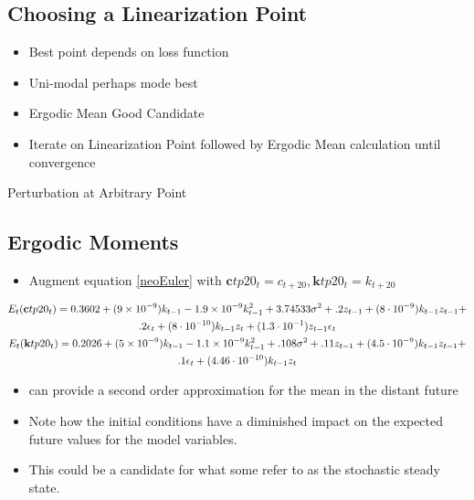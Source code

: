 \documentclass[12pt]{article}
\begin{document}
\subsection{Choosing a Linearization Point}
  \begin{itemize}
  \item Best point depends on loss function
  \item Uni-modal perhaps mode best
  \item Ergodic Mean Good Candidate
  \item Iterate on Linearization Point followed by Ergodic Mean calculation until convergence
  \end{itemize}

{Perturbation at Arbitrary Point}
{\small
{}
}



\subsection{Ergodic  Moments}
\label{sec:impulse-resp-funct}

  \begin{itemize}
   \item Augment equation \ref{neoEuler} with $\mathbf{c}tp20_t = c_{t+20}, \mathbf{k}tp20_t = k_{t+20}$
    \end{itemize}
{\tiny
 \begin{gather*} 
E_t(     \mathbf{c}tp20_t)= 0.3602 + (9 \times  10^{-9}) k_{t-1} -1.9 \times 10^{-9} k_{t-1}^2 + 3.74533 \sigma^2 + .2 z_{t-1} +(8 \cdot 10^{-9}) k_{t-1} z_{t-1} +\\
 .2 \epsilon_t  +(8 \cdot 10^{-10}) k_{t-1} z_t + (1.3 \cdot 10^{-1}) z_{t-1} \epsilon_t\\
E_t(       \mathbf{k}tp20_t) = 0.2026 + (5 \times  10^{-9}) k_{t-1} -1.1 \times 10^{-9} k_{t-1}^2 + .108 \sigma^2 + .11 z_{t-1} +(4.5 \cdot 10^{-9}) k_{t-1} z_{t-1} +\\
 .1 \epsilon_t  +(4.46 \cdot 10^{-10}) k_{t-1} z_t 
 \end{gather*}
}
    \begin{itemize}
  \item can provide a second order approximation for the
mean in the distant future
 \item Note how the initial conditions have a diminished 
 impact on the expected future
 values for the model variables.
\item This could be a candidate for what
some refer to as the stochastic steady state.


   \end{itemize}
\end{document}
